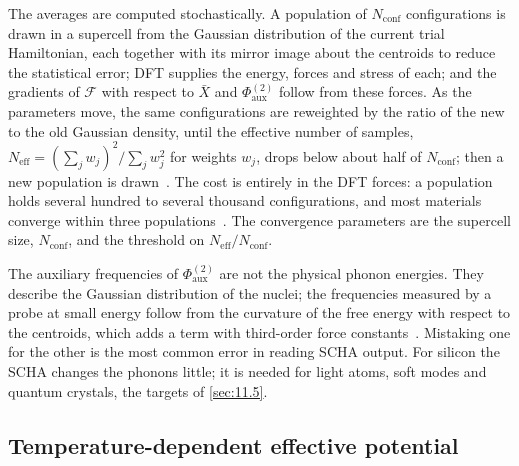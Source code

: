 The averages are computed stochastically. A population of $N_{\mathrm{conf}}$ configurations is drawn in a supercell from the Gaussian distribution of the current trial Hamiltonian, each together with its mirror image about the centroids to reduce the statistical error; DFT supplies the energy, forces and stress of each; and the gradients of $\mathcal{F}$ with respect to $\bar X$ and $\Phi^{(2)}_{\mathrm{aux}}$ follow from these forces. As the parameters move, the same configurations are reweighted by the ratio of the new to the old Gaussian density, until the effective number of samples, $N_{\mathrm{eff}} = (\sum_jw_j)^2/\sum_jw_j^2$ for weights $w_j$, drops below about half of $N_{\mathrm{conf}}$; then a new population is drawn~\cite[Eqs.~(21), (38) and~(39)]{monacelli2021stochastic}. The cost is entirely in the DFT forces: a population holds several hundred to several thousand configurations, and most materials converge within three populations~\cite[Sect.~III\,B]{monacelli2021stochastic}. The convergence parameters are the supercell size, $N_{\mathrm{conf}}$, and the threshold on $N_{\mathrm{eff}}/N_{\mathrm{conf}}$.

The auxiliary frequencies of $\Phi^{(2)}_{\mathrm{aux}}$ are not the physical phonon energies. They describe the Gaussian distribution of the nuclei; the frequencies measured by a probe at small energy follow from the curvature of the free energy with respect to the centroids, which adds a term with third-order force constants~\cite[Sect.~IV]{monacelli2021stochastic}. Mistaking one for the other is the most common error in reading SCHA output. For silicon the SCHA changes the phonons little; it is needed for light atoms, soft modes and quantum crystals, the targets of \cref{sec:11.5}.

\subsection{Temperature-dependent effective potential}

